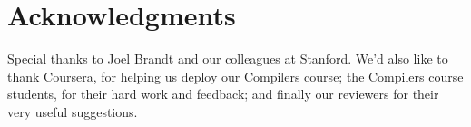 \documentclass{sigchi}
\begin{document}
\section{Acknowledgments}
Special thanks to Joel Brandt and our colleagues at Stanford. We'd also like to thank Coursera, for helping us deploy our Compilers course; the Compilers course students, for their hard work and feedback; and finally our reviewers for their very useful suggestions.


% 

\balance



\end{document}
